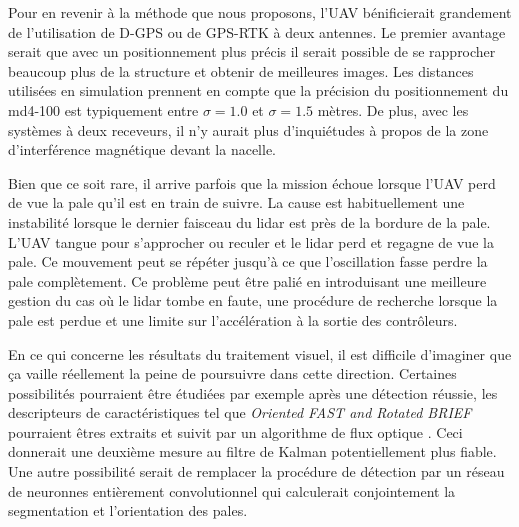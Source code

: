 Pour en revenir à la méthode que nous proposons, l'UAV bénificierait grandement de l'utilisation de D-GPS ou de GPS-RTK à deux antennes. Le premier avantage serait que avec un positionnement plus précis il serait possible de se rapprocher beaucoup plus de la structure et obtenir de meilleures images. Les distances utilisées en simulation prennent en compte que la précision du positionnement du md4-100 est typiquement entre $\sigma = 1.0$ et $\sigma = 1.5$ mètres. De plus, avec les systèmes à deux receveurs, il n'y aurait plus d'inquiétudes à propos de la zone d'interférence magnétique devant la nacelle.

Bien que ce soit rare, il arrive parfois que la mission échoue lorsque l'UAV perd de vue la pale qu'il est en train de suivre. La cause est habituellement une instabilité lorsque le dernier faisceau du lidar est près de la bordure de la pale. L'UAV tangue pour s'approcher ou reculer et le lidar perd et regagne de vue la pale. Ce mouvement peut se répéter jusqu'à ce que l'oscillation fasse perdre la pale complètement. Ce problème peut être palié en introduisant une meilleure gestion du cas où le lidar tombe en faute, une procédure de recherche lorsque la pale est perdue et une limite sur l'accélération à la sortie des contrôleurs.

En ce qui concerne les résultats du traitement visuel, il est difficile d'imaginer que ça vaille réellement la peine de poursuivre dans cette direction. Certaines possibilités pourraient être étudiées par exemple après une détection réussie, les descripteurs de caractéristiques tel que \textit{Oriented FAST and Rotated BRIEF} \citep{Rublee2011} pourraient êtres extraits et suivit par un algorithme de flux optique \citep{Lucas1981}. Ceci donnerait une deuxième mesure au filtre de Kalman potentiellement plus fiable. Une autre possibilité serait de remplacer la procédure de détection par un réseau de neuronnes entièrement convolutionnel qui calculerait conjointement la segmentation et l'orientation des pales.


